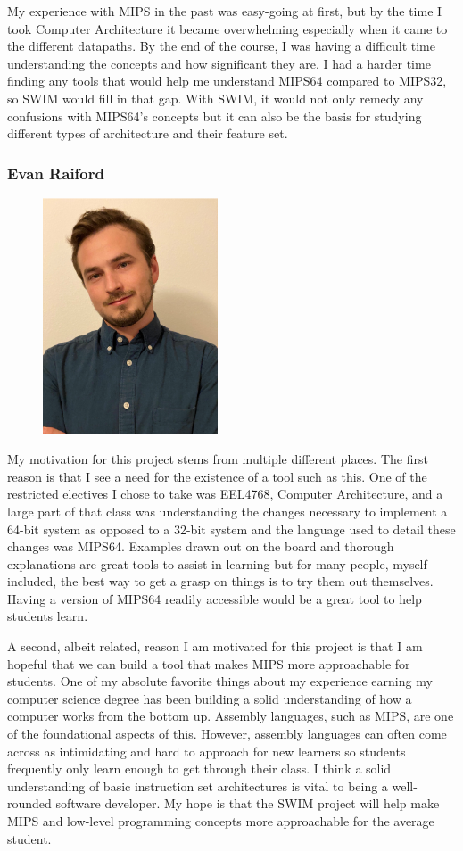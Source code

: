 \documentclass[
    paper=letter,
    parskip=half,
    fontsize=12pt,
    titlepage=firstiscover,
    toc=bibliography,
    numbers=endperiod
]{scrartcl}
\begin{document}
My experience with MIPS in the past was easy-going at first, but by the time I took Computer Architecture it became overwhelming especially when it came to the different datapaths. By the end of the course, I was having a difficult time understanding the concepts and how significant they are. I had a harder time finding any tools that would help me understand MIPS64 compared to MIPS32, so SWIM would fill in that gap. With SWIM, it would not only remedy any confusions with MIPS64's concepts but it can also be the basis for studying different types of architecture and their feature set.


\subsubsection{Evan Raiford}
\begin{figure}[H]
    \includegraphics[height=7cm]{profile-evan}
\end{figure}

My motivation for this project stems from multiple different places. The first reason is that I see a need for the existence of a tool such as this. One of the restricted electives I chose to take was EEL4768, Computer Architecture, and a large part of that class was understanding the changes necessary to implement a 64-bit system as opposed to a 32-bit system and the language used to detail these changes was MIPS64. Examples drawn out on the board and thorough explanations are great tools to assist in learning but for many people, myself included, the best way to get a grasp on things is to try them out themselves. Having a version of MIPS64 readily accessible would be a great tool to help students learn.

A second, albeit related, reason I am motivated for this project is that I am hopeful that we can build a tool that makes MIPS more approachable for students. One of my absolute favorite things about my experience earning my computer science degree has been building a solid understanding of how a computer works from the bottom up. Assembly languages, such as MIPS, are one of the foundational aspects of this. However, assembly languages can often come across as intimidating and hard to approach for new learners so students frequently only learn enough to get through their class. I think a solid understanding of basic instruction set architectures is vital to being a well-rounded software developer. My hope is that the SWIM project will help make MIPS and low-level programming concepts more approachable for the average student.
\end{document}
